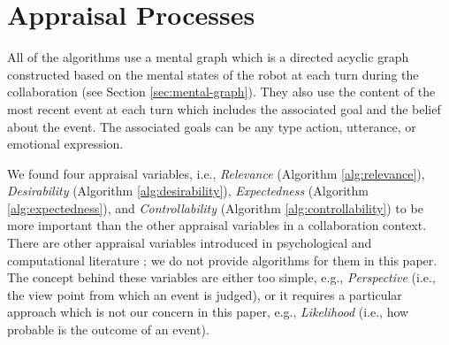 \documentclass[letterpaper]{article}
\begin{document}
\begin{center}
\end{center}

\section{Appraisal Processes}

All of the algorithms use a mental graph which is a directed acyclic graph
constructed based on the mental states of the robot at each turn during the
collaboration (see Section \ref{sec:mental-graph}). They also use the
content of the most recent event at each turn which includes the associated
goal and the belief about the event. The associated goals can be any type
action, utterance, or emotional expression.

We found four appraisal variables, i.e., \textit{Relevance} (Algorithm
\ref{alg:relevance}), \textit{Desirability} (Algorithm \ref{alg:desirability}),
\textit{Expectedness} (Algorithm \ref{alg:expectedness}), and
\textit{Controllability} (Algorithm \ref{alg:controllability}) to be more
important than the other appraisal variables in a collaboration context.
There are other appraisal variables introduced in psychological
\cite{scherer:appraisal-processes} and computational literature
\cite{gratch:domain-independent}; we do not provide algorithms for them in this
paper. The concept behind these variables are either too simple, e.g.,
\textit{Perspective} (i.e., the view point from which an event is judged), or it
requires a particular approach which is not our concern in this paper, e.g.,
\textit{Likelihood} (i.e., how probable is the outcome of an event).
\end{document}
